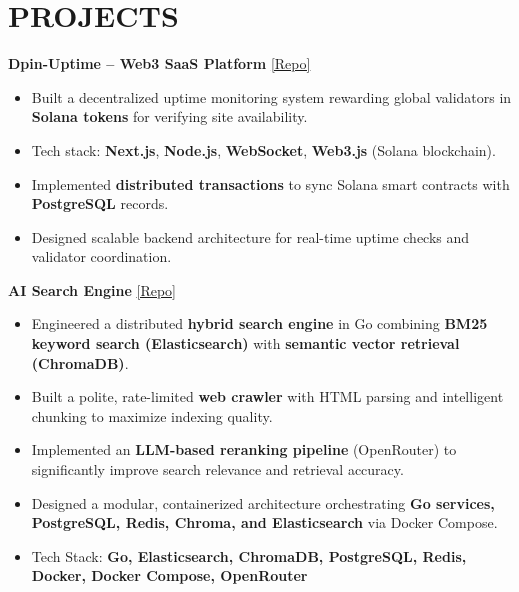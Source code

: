 \documentclass[a4paper,10pt]{article}
\begin{document}
\section*{PROJECTS}
\noindent
\textbf{Dpin-Uptime – Web3 SaaS Platform}
\hfill
\href{https://github.com/jai0651/dpin-uptime}{\textcolor{mainblue}{[Repo]}} \\
\vspace{-0.5em}
\begin{itemize}[leftmargin=1.5em, itemsep=0.25em, topsep=0pt]
  \item Built a decentralized uptime monitoring system rewarding global validators in \textbf{Solana tokens} for verifying site availability.
  \item Tech stack: \textbf{Next.js}, \textbf{Node.js}, \textbf{WebSocket}, \textbf{Web3.js} (Solana blockchain).
  \item Implemented \textbf{distributed transactions} to sync Solana smart contracts with \textbf{PostgreSQL} records.
  \item Designed scalable backend architecture for real-time uptime checks and validator coordination.
\end{itemize}

\vspace{0.5em}
\noindent
\textbf{AI Search Engine}
\hfill
\href{https://github.com/jai0651/open-exa}{\textcolor{mainblue}{[Repo]}}
\vspace{-0.4em}
\begin{itemize}[leftmargin=1.5em, itemsep=0.25em]
  \item Engineered a distributed \textbf{hybrid search engine} in Go combining \textbf{BM25 keyword search (Elasticsearch)} with \textbf{semantic vector retrieval (ChromaDB)}.
  \item Built a polite, rate-limited \textbf{web crawler} with HTML parsing and intelligent chunking to maximize indexing quality.
  \item Implemented an \textbf{LLM-based reranking pipeline} (OpenRouter) to significantly improve search relevance and retrieval accuracy.
  \item Designed a modular, containerized architecture orchestrating \textbf{Go services, PostgreSQL, Redis, Chroma, and Elasticsearch} via Docker Compose.
  \item Tech Stack: \textbf{Go, Elasticsearch, ChromaDB, PostgreSQL, Redis, Docker, Docker Compose, OpenRouter}
\end{itemize}
\end{document}
